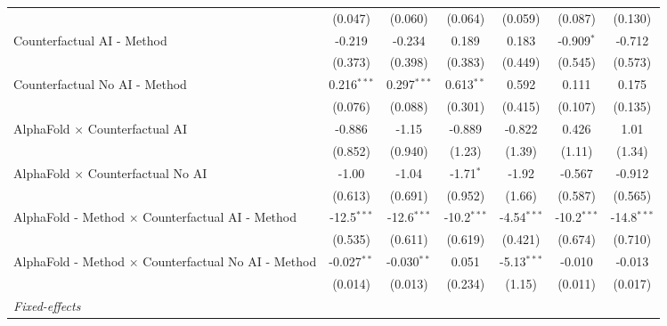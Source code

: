 \begin{tabular}{lcccccc}
                                                              & (0.047)       & (0.060)       & (0.064)       & (0.059)       & (0.087)       & (0.130)\\   
   Counterfactual AI - Method                                 & -0.219        & -0.234        & 0.189         & 0.183         & -0.909$^{*}$  & -0.712\\   
                                                              & (0.373)       & (0.398)       & (0.383)       & (0.449)       & (0.545)       & (0.573)\\   
   Counterfactual No AI - Method                              & 0.216$^{***}$ & 0.297$^{***}$ & 0.613$^{**}$  & 0.592         & 0.111         & 0.175\\   
                                                              & (0.076)       & (0.088)       & (0.301)       & (0.415)       & (0.107)       & (0.135)\\   
   AlphaFold $\times$ Counterfactual AI                       & -0.886        & -1.15         & -0.889        & -0.822        & 0.426         & 1.01\\   
                                                              & (0.852)       & (0.940)       & (1.23)        & (1.39)        & (1.11)        & (1.34)\\   
   AlphaFold $\times$ Counterfactual No AI                    & -1.00         & -1.04         & -1.71$^{*}$   & -1.92         & -0.567        & -0.912\\   
                                                              & (0.613)       & (0.691)       & (0.952)       & (1.66)        & (0.587)       & (0.565)\\   
   AlphaFold - Method $\times$ Counterfactual AI - Method     & -12.5$^{***}$ & -12.6$^{***}$ & -10.2$^{***}$ & -4.54$^{***}$ & -10.2$^{***}$ & -14.8$^{***}$\\   
                                                              & (0.535)       & (0.611)       & (0.619)       & (0.421)       & (0.674)       & (0.710)\\   
   AlphaFold - Method $\times$ Counterfactual No AI - Method  & -0.027$^{**}$ & -0.030$^{**}$ & 0.051         & -5.13$^{***}$ & -0.010        & -0.013\\   
                                                              & (0.014)       & (0.013)       & (0.234)       & (1.15)        & (0.011)       & (0.017)\\   
   \midrule
   \emph{Fixed-effects}\\

\end{tabular}

